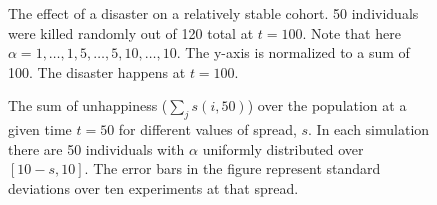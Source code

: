 \documentclass[]{article}
\begin{document}
	\begin{figure}
		\centering
		\caption{The effect of a disaster on a relatively stable cohort. 50 individuals were killed randomly out of 120 total at $t=100$. Note that here $\alpha = {1,\dots,1,5,\dots,5,10,\dots,10}$. The y-axis is normalized to a sum of 100. The disaster happens at $t=100$.}
		\label{fig:degreedistdiscrete1}
	\end{figure}
	
	\begin{figure}
		\centering
		\caption{The sum of unhappiness ($\sum_j s(i, 50)$) over the population at a given time $t=50$ for different values of spread, $s$. In each simulation there are 50 individuals with $\alpha$ uniformly distributed over $[10-s, 10]$. The error bars in the figure represent standard deviations over ten experiments at that spread.}
		\label{fig:the-total-unhappiness-versus-spread-of-alpha}
	\end{figure}

	
	
	
	
\end{document}
